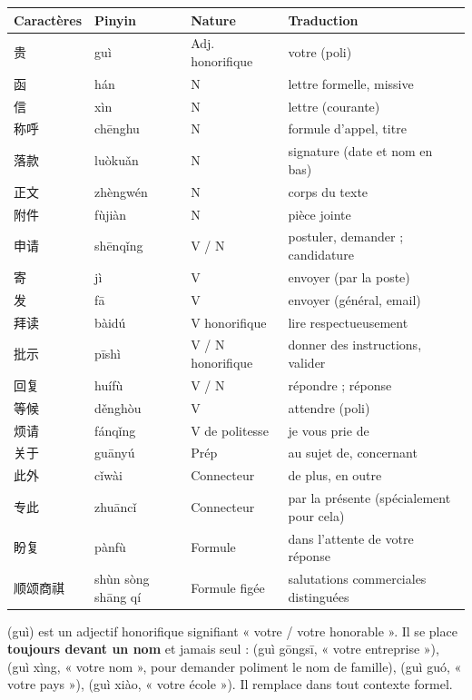 \documentclass[11pt]{article}
\newcommand{\zh}[1]{\ifmmode\text{#1}\else{#1}\fi}
\begin{document}
\begin{center}
\begin{tabularx}{\linewidth}{|X|X|X|X|}
\hline
\rowcolor{popblueL} Caractères & Pinyin & Nature & Traduction \\
\hline
贵 & guì & Adj. honorifique & votre (poli) \\
\hline
函 & hán & N & lettre formelle, missive \\
\hline
信 & xìn & N & lettre (courante) \\
\hline
称呼 & chēnghu & N & formule d'appel, titre \\
\hline
落款 & luòkuǎn & N & signature (date et nom en bas) \\
\hline
正文 & zhèngwén & N & corps du texte \\
\hline
附件 & fùjiàn & N & pièce jointe \\
\hline
申请 & shēnqǐng & V / N & postuler, demander ; candidature \\
\hline
寄 & jì & V & envoyer (par la poste) \\
\hline
发 & fā & V & envoyer (général, email) \\
\hline
拜读 & bàidú & V honorifique & lire respectueusement \\
\hline
批示 & pīshì & V / N honorifique & donner des instructions, valider \\
\hline
回复 & huífù & V / N & répondre ; réponse \\
\hline
等候 & děnghòu & V & attendre (poli) \\
\hline
烦请 & fánqǐng & V de politesse & je vous prie de \\
\hline
关于 & guānyú & Prép & au sujet de, concernant \\
\hline
此外 & cǐwài & Connecteur & de plus, en outre \\
\hline
专此 & zhuāncǐ & Connecteur & par la présente (spécialement pour cela) \\
\hline
盼复 & pànfù & Formule & dans l'attente de votre réponse \\
\hline
顺颂商祺 & shùn sòng shāng qí & Formule figée & salutations commerciales distinguées \\
\hline
\end{tabularx}
\end{center}

\begin{definition}
\zh{贵} (guì) est un adjectif honorifique signifiant « votre / votre honorable ». Il se place \textbf{toujours devant un nom} et jamais seul : \zh{贵公司} (guì gōngsī, « votre entreprise »), \zh{贵姓} (guì xìng, « votre nom », pour demander poliment le nom de famille), \zh{贵国} (guì guó, « votre pays »), \zh{贵校} (guì xiào, « votre école »). Il remplace \zh{你的} dans tout contexte formel.
\end{definition}
\end{document}
